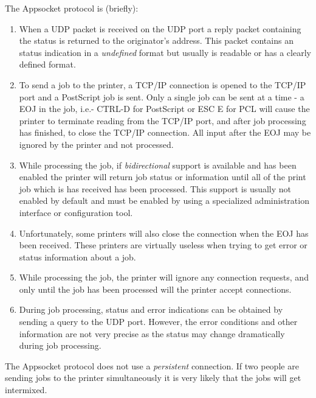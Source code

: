 \documentclass[a4paper]{article}
\begin{document}
The Appsocket protocol is (briefly):
\begin{enumerate}
\item  When a UDP packet is received on the UDP port a reply
packet containing the status is returned to the originator's
address.
This packet contains an status indication
in a {\itshape undefined\/} format but usually is readable or has a clearly defined format.
\item  To send a job to the printer,  a TCP/IP connection is opened to the TCP/IP port
and a PostScript job is sent.
Only a single job can be sent at a time - a EOJ in the job, i.e.-
CTRL-D for PostScript or ESC E for PCL
will cause the printer to terminate reading from the TCP/IP port,
and after job processing has finished,
to close the TCP/IP connection.
All input after the EOJ may be ignored by the printer and not processed.
\item While processing the job,
if {\itshape bidirectional\/} support is available
and has been enabled
the printer will return job status or information until all of the print job
which is has received has been processed.
This support is usually not enabled by default and must be enabled
by using a specialized administration interface or configuration tool.
\item Unfortunately,
some printers will also close the connection when the EOJ has been received.
These printers are virtually useless when trying to get error or status information
about a job.
\item While processing the job,
the printer will ignore any connection requests,
and only until the job has been processed
will the printer accept connections.
\item During job processing,  status and error indications can be obtained by sending
a query to the UDP port.
However,  the error conditions and other information are not very precise as the
status may change dramatically during job processing.
\end{enumerate}


The Appsocket protocol does not use a {\itshape persistent\/} connection.
If two people are sending jobs to the printer simultaneously it is very likely
that the jobs will get intermixed.
\end{document}
